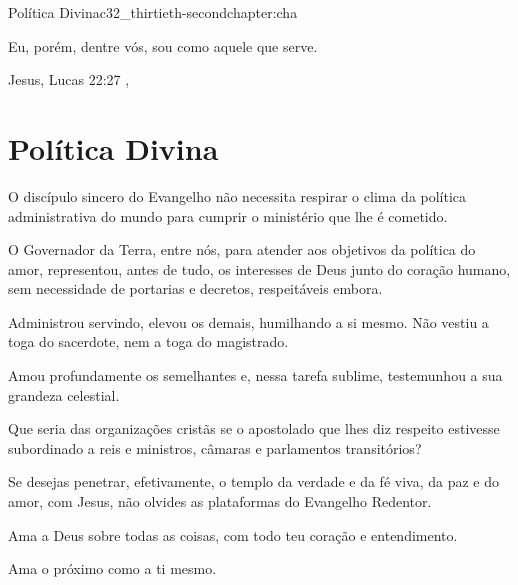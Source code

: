 \begin{chapterpage}{Política Divina}{c32_thirtieth-secondchapter:cha}

\begin{myquotation} Eu, porém, dentre vós, sou como aquele que serve.

\par\vspace*{15mm}
\mbox{}\hfill \emdash{}Jesus, Lucas 22:27 
, %
\par\end{myquotation}

\end{chapterpage}



\section{Política Divina}\label{c1_basicformatting:sec}

\emdash{}O discípulo sincero do Evangelho não necessita respirar o clima da política administrativa do mundo para cumprir o ministério que lhe é cometido.

\emdash{}O Governador da Terra, entre nós, para atender aos objetivos da política do amor, representou, antes de tudo, os interesses de Deus junto do coração humano, sem necessidade de portarias e decretos, respeitáveis embora.

\emdash{}Administrou servindo, elevou os demais, humilhando a si mesmo. Não vestiu a toga do sacerdote, nem a toga do magistrado.

\emdash{}Amou profundamente os semelhantes e, nessa tarefa sublime, testemunhou a sua grandeza celestial.

\emdash{}Que seria das organizações cristãs se o apostolado que lhes diz respeito estivesse subordinado a reis e ministros, câmaras e parlamentos transitórios?

\emdash{}Se desejas penetrar, efetivamente, o templo da verdade e da fé viva, da paz e do amor, com Jesus, não olvides as plataformas do Evangelho Redentor.

\emdash{}Ama a Deus sobre todas as coisas, com todo teu coração e entendimento.

\emdash{}Ama o próximo como a ti mesmo.


